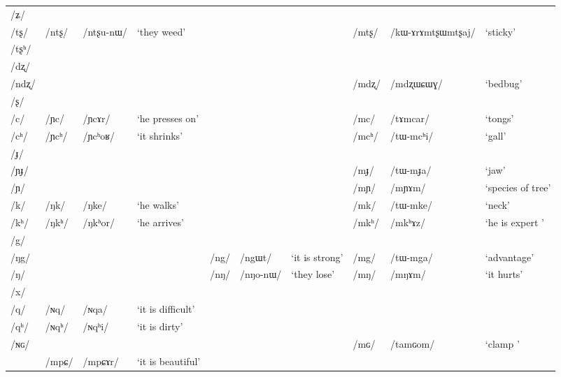 \documentclass[oneside,a4paper,11pt]{article}
\newcommand{\ipa}[1]{\mbox{\phon/#1/}}
\newcommand{\deux}[1]{\ipa{#1}\addtocounter{2clusters}{1}}
\newcommand{\trois}[1]{\ipa{#1}\addtocounter{3clusters}{1}}
\newcommand{\resetcounters}[2]{
\newcounter{#1}
\newcounter{#2}
 \setcounter{#1}{\value{2clusters}}
  \setcounter{#2}{\value{3clusters}}
 \setcounter{2clusters}{0}
  \setcounter{3clusters}{0}
}
\begin{document}
\begin{table}
{\begin{tabular}{llllllllll}
\ipa{ʑ} & & & & & & & & & \\
\ipa{tʂ} & \deux{ntʂ} & \ipa{ntʂu-nɯ} & `they weed' & & & & \deux{mtʂ} & \ipa{kɯ-ɤrɤmtʂɯmtʂaj} & `sticky' \\
\ipa{tʂʰ} & & & & & & & & & \\
\ipa{dʐ} & & & & & & & & & \\
\ipa{ndʐ} & & & & & & & \deux{mdʐ} & \ipa{mdʐɯɕɯɣ} & `bedbug' \\
\ipa{ʂ} & & & & & & & & & \\
\ipa{c} & \deux{ɲc} & \ipa{ɲcɤr} & `he presses on' & & & & \deux{mc} & \ipa{tɤmcar} & `tongs' \\
\ipa{cʰ} & \deux{ɲcʰ} & \ipa{ɲcʰoʁ} & `it shrinks' & & & & \deux{mcʰ} & \ipa{tɯ-mcʰi} & `gall' \\
\ipa{ɟ} & & & & & & & & & \\
\ipa{ɲɟ} & & & & & & & \deux{mɟ} & \ipa{tɯ-mɟa} & `jaw' \\
\ipa{ɲ} & & & & & & & \deux{mɲ} & \ipa{mɲɤm} & `species of tree' \\
\ipa{k} & \deux{ŋk} & \ipa{ŋke} & `he walks' & & & & \deux{mk} & \ipa{tɯ-mke} & `neck' \\
\ipa{kʰ} & \deux{ŋkʰ} & \ipa{ŋkʰor} & `he arrives' & & & & \deux{mkʰ} & \ipa{mkʰɤz} & `he is expert ' \\
\ipa{g} & & & & & & & & & \\
\ipa{ŋg} & & & & \deux{ng} & \ipa{ngɯt} & `it is strong' & \deux{mg} & \ipa{tɯ-mga} & `advantage' \\
\ipa{ŋ} & & & & \deux{nŋ} & \ipa{nŋo-nɯ} & `they lose' & \deux{mŋ} & \ipa{mŋɤm} & `it hurts' \\
\ipa{x} & & & & & & & & & \\
\ipa{q} & \deux{ɴq} & \ipa{ɴqa} & `it is difficult' & & & & & &\\
\ipa{qʰ} & \deux{ɴqʰ} & \ipa{ɴqʰi} & `it is dirty' & & & & & &\\
\ipa{ɴɢ} & & & & & & & \deux{mɢ} & \ipa{tamɢom} & `clamp ' \\
\midrule
&\trois{mpɕ} &\ipa{mpɕɤr} & `it is beautiful' \\
\bottomrule
\end{tabular}}
\end{table} 
 \resetcounters{2nC}{3nC} %
 
  
  
\end{document}
